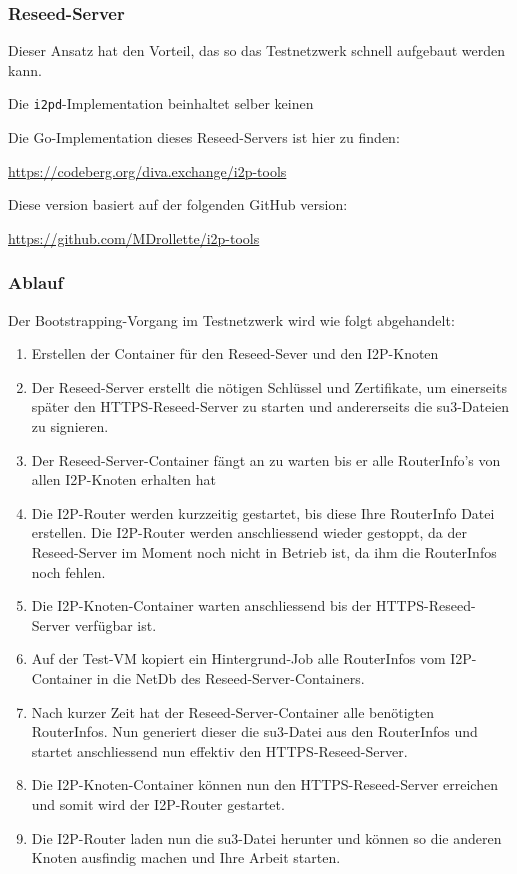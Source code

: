 \subsubsection{Reseed-Server}

Dieser Ansatz hat den Vorteil, das so das Testnetzwerk schnell aufgebaut werden kann.

Die \lstinline|i2pd|-Implementation beinhaltet selber keinen 

Die Go-Implementation dieses Reseed-Servers ist hier zu finden:

\url{https://codeberg.org/diva.exchange/i2p-tools}

Diese version basiert auf der folgenden GitHub version:

\url{https://github.com/MDrollette/i2p-tools}

\subsubsection{Ablauf}


Der Bootstrapping-Vorgang im Testnetzwerk wird wie folgt abgehandelt:

\begin{enumerate}
    \item Erstellen der Container für den Reseed-Sever und den I2P-Knoten
    \item Der Reseed-Server erstellt die nötigen Schlüssel und Zertifikate, um einerseits später den HTTPS-Reseed-Server zu starten und andererseits die su3-Dateien zu signieren.
    \item Der Reseed-Server-Container fängt an zu warten bis er alle RouterInfo's von allen I2P-Knoten erhalten hat
    \item Die I2P-Router werden kurzzeitig gestartet, bis diese Ihre RouterInfo Datei erstellen. Die I2P-Router werden anschliessend wieder gestoppt, da der Reseed-Server im Moment noch nicht in Betrieb ist, da ihm die RouterInfos noch fehlen.
    \item Die I2P-Knoten-Container warten anschliessend bis der HTTPS-Reseed-Server verfügbar ist.
    \item Auf der Test-VM kopiert ein Hintergrund-Job alle RouterInfos vom I2P-Container in die NetDb des Reseed-Server-Containers.
    \item Nach kurzer Zeit hat der Reseed-Server-Container alle benötigten RouterInfos. Nun generiert dieser die su3-Datei aus den RouterInfos und startet anschliessend nun effektiv den HTTPS-Reseed-Server.
    \item Die I2P-Knoten-Container können nun den HTTPS-Reseed-Server erreichen und somit wird der I2P-Router gestartet.
    \item Die I2P-Router laden nun die su3-Datei herunter und können so die anderen Knoten ausfindig machen und Ihre Arbeit starten.
\end{enumerate}

